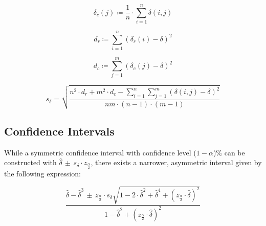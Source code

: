 \documentclass[pdflatex,sn-mathphys-num]{sn-jnl}
\theoremstyle{thmstyleone}
\theoremstyle{thmstyletwo}
\theoremstyle{thmstylethree}
\begin{document}
            \vspace{10pt}

            \begin{equation}
                 \delta_{c}(j) \coloneqq \frac{1}{n} \cdot \sum_{i=1}^{n} \delta \left( i, j \right)
            \end{equation}

            \vspace{10pt}

            \begin{equation}
                 d_r \coloneqq \sum_{i=1}^{n} \left( \delta_{r}(i) - \delta \right)^{2}
            \end{equation}
           
            \vspace{10pt}

            \begin{equation}
                 d_{c} \coloneqq \sum_{j=1}^{m} \left( \delta_{c}(j) - \delta \right)^{2}
            \end{equation}

            \vspace{10pt}

            \begin{equation}
                s_{\delta} = \sqrt{\frac{n^2 \cdot d_{r} + m^{2} \cdot d_{c} - \sum_{i = 1}^{n} \sum_{j = 1}^{m} \left( \delta \left( i, j \right) - \delta \right)^{2} }{nm \cdot (n - 1) \cdot (m - 1)}}
            \end{equation}

        \vspace{10pt}

        \subsection{Confidence Intervals}

            While a symmetric confidence interval with confidence level ($1 - \alpha$)\% can be constructed with $\hat{\delta} \, \pm \, s_{\delta} \cdot z_{\frac{\alpha}{2}}$, there exists a narrower, asymmetric interval given by the following expression:

            \begin{equation}
                \frac{\hat{\delta} - \hat{\delta}^{3} \, \pm \, z_{\frac{\alpha}{2}} \cdot s_{\delta} \sqrt{1 - 2 \cdot \hat{\delta}^{2} + \hat{\delta}^{4} + \left( z_{\frac{\alpha}{2}} \cdot \hat{\delta} \right)^{2}}}{1 - \hat{\delta}^{2} + \left( z_{\frac{\alpha}{2}} \cdot \hat{\delta} \right)^{2}}
            \end{equation}
\end{document}
